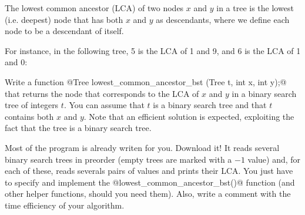 
\Statement

The lowest common ancestor (LCA) of two nodes $x$ and $y$ in a tree is the
lowest (i.e. deepest) node that has both $x$ and $y$ as descendants, where we
define each node to be a descendant of itself.

\medskip

For instance, in the following tree, 5 is the LCA of 1 and 9, and 6 is the LCA
of 1 and 0:


\medskip

Write a function @Tree lowest_common_ancestor_bst (Tree t, int x, int y);@
that returns the \linebreak node that corresponds to the LCA of $x$ and $y$
in a binary search tree of integers $t$. You can assume that $t$ is a binary
search tree and that $t$ contains both $x$ and $y$. Note that an efficient
solution is expected, exploiting the fact that the tree is a binary search
tree.

\medskip

Most of the program is already writen for you. Download it! It reads several
binary search trees in preorder (empty trees are marked with a $-1$ value)
and, for each of these, reads severals pairs of values and prints their LCA.
You just have to specify and implement the @lowest_common_ancestor_bst()@
function (and other helper functions, should you need them). Also, write
a comment with the time efficiency of your algorithm.

\SampleOneCol
